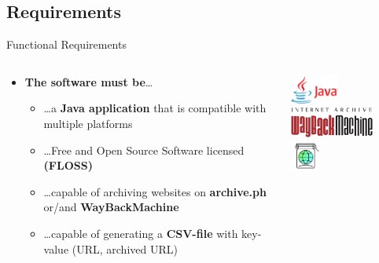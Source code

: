 \documentclass[
    ngerman,%
    authorontitle=true,
]{bfhbeamer}
\begin{document}
    \subsection{Requirements}
    \begin{frame}{Functional Requirements}
        \begin{columns} %
            \begin{column}{0.5\textwidth} %
                \begin{itemize}
                    \item \textbf{The software must be}\ldots
                    \begin{itemize}
                        \item \ldots a \textbf{Java application} that is compatible with multiple platforms
                        \item \ldots Free and Open Source Software licensed \textbf{(FLOSS)}
                        \item \ldots capable of archiving websites on \textbf{archive.ph} or/and \textbf{WayBackMachine}
                        \item \ldots capable of generating a \textbf{CSV-file} with key-value (URL, archived URL)
                    \end{itemize}
                \end{itemize}
            \end{column}
            \begin{column}{0.3\textwidth} %
                \begin{center}
                    \includegraphics[height=1cm]{pictures/Java-Logo}
                    \vspace{1em}
                    \includegraphics[height=1cm]{pictures/Wayback_Machine_logo}
                    \vspace{1em}
                    \includegraphics[height=1cm]{pictures/archive_today_logo}
                \end{center}
            \end{column}
        \end{columns}


    \end{frame}
\end{document}
